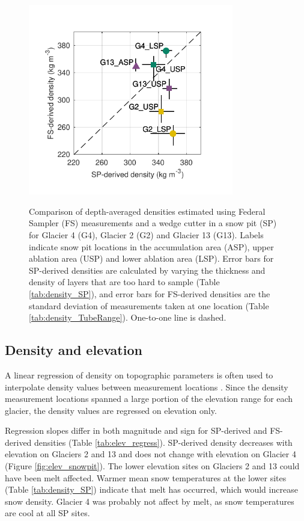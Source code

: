 \documentclass{sfuthesis}
\begin{document}
\begin{figure}
	\centering
	\includegraphics[width =0.8\textwidth]{SPvsFS.pdf}\\
	\caption{Comparison of depth-averaged densities estimated using Federal Sampler (FS) measurements and  a wedge cutter in a snow pit (SP)  for Glacier 4 (G4), Glacier 2 (G2) and Glacier 13 (G13). Labels indicate snow pit locations in the accumulation area (ASP), upper ablation area (USP) and lower ablation area (LSP). Error bars for SP-derived densities are calculated by varying the thickness and density of layers that are too hard to sample (Table \ref{tab:density_SP}), and error bars for FS-derived densities are the standard deviation of measurements taken at one location (Table \ref{tab:density_TubeRange}). One-to-one line is dashed.}
	\label{fig:density_pitVStube}
\end{figure}


\subsection{Density and elevation}

A linear regression of density on topographic parameters is often used to interpolate density values between measurement locations \citep[e.g.][]{Elder1998, Molotch2005,Wetlaufer2016}. Since the density measurement locations spanned a large portion of the elevation range for each glacier, the density values are regressed on elevation only. 

Regression slopes differ in both magnitude and sign for SP-derived and FS-derived densities (Table \ref{tab:elev_regress}). SP-derived density decreases with elevation on Glaciers 2 and 13 and does not change with elevation on Glacier 4 (Figure \ref{fig:elev_snowpit}). The lower elevation sites on Glaciers 2 and 13 could have been melt affected. Warmer mean snow temperatures at the lower sites (Table \ref{tab:density_SP}) indicate that melt has occurred, which would increase snow density. Glacier 4 was probably not affect by melt, as snow temperatures are cool at all SP sites. 
\end{document}
